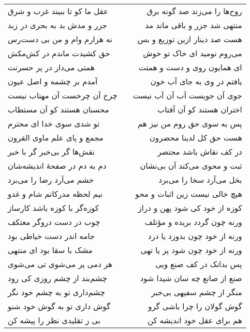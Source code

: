 \begin{center}
\begin{longtable}{l p{0.5cm} r}
عقل ما کو تا ببیند غرب و شرق
&&
روح‌ها را می‌زند صد گونه برق
\\
جزر و مدش بد به بحری در زبد
&&
منتهی شد جزر و باقی ماند مد
\\
نه هزارم وام و من بی دست‌رس
&&
هست صد دینار ازین توزیع و بس
\\
حق کشیدت ماندم در کش‌مکش
&&
می‌روم نومید ای خاک تو خوش
\\
همتی می‌دار در پر حسرتت
&&
ای همایون روی و دست و همتت
\\
آمدم بر چشمه و اصل عیون
&&
یافتم در وی به جای آب خون
\\
چرخ آن چرخست آن مهتاب نیست
&&
جوی آن جویست آب آن آب نیست
\\
محسنان هستند کو آن مستطاب
&&
اختران هستند کو آن آفتاب
\\
تو شدی سوی خدا ای محترم
&&
پس به سوی حق روم من نیز هم
\\
مجمع و پای علم ماوی القرون
&&
هست حق کل لدینا محضرون
\\
نقش‌ها گر بی‌خبر گر با خبر
&&
در کف نقاش باشد محتصر
\\
دم به دم در صفحهٔ اندیشه‌شان
&&
ثبت و محوی می‌کند آن بی‌نشان
\\
خشم می‌آرد رضا را می‌برد
&&
بخل می‌آرد سخا را می‌برد
\\
نیم لحظه مدرکاتم شام و غدو
&&
هیچ خالی نیست زین اثبات و محو
\\
کوزه‌گر با کوزه باشد کارساز
&&
کوزه از خود کی شود پهن و دراز
\\
چوب در دست دروگر معتکف
&&
ورنه چون گردد بریده و مؤتلف
\\
جامه اندر دست خیاطی بود
&&
ورنه از خود چون بدوزد یا درد
\\
مشک با سقا بود ای منتهی
&&
ورنه از خود چون شود پر یا تهی
\\
هر دمی پر می‌شوی تی می‌شوی
&&
پس بدانک در کف صنع ویی
\\
چشم‌بند از چشم روزی کی رود
&&
صنع از صانع چه سان شیدا شود
\\
چشم‌داری تو به چشم خود نگر
&&
منگر از چشم سفیهی بی‌خبر
\\
گوش داری تو به گوش خود شنو
&&
گوش گولان را چرا باشی گرو
\\
بی ز تقلیدی نظر را پیشه کن
&&
هم برای عقل خود اندیشه کن
\\
\end{longtable}
\end{center}
